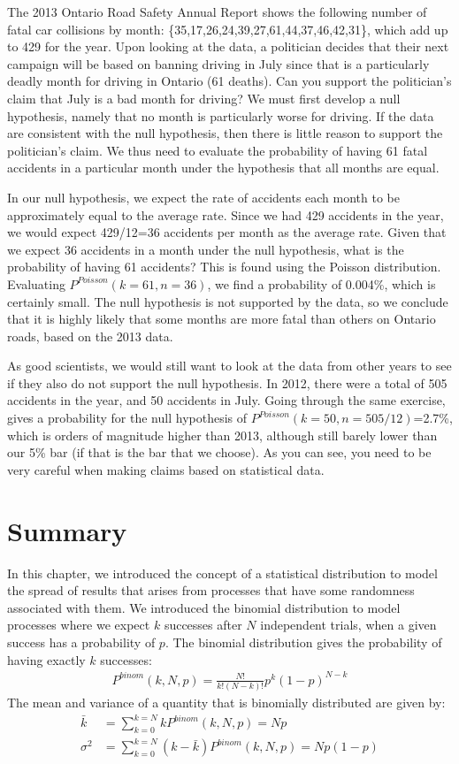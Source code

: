 \begin{example}{}{The 2013 Ontario Road Safety Annual Report shows the following number of fatal car collisions by month: \{35,17,26,24,39,27,61,44,37,46,42,31\}, which add up to 429 for the year. Upon looking at the data, a politician decides that their next campaign will be based on banning driving in July since that is a particularly deadly month for driving in Ontario (61 deaths). Can you support the politician's claim that July is a bad month for driving?}{}
We must first develop a null hypothesis, namely that no month is particularly worse for driving. If the data are consistent with the null hypothesis, then there is little reason to support the politician's claim. We thus need to evaluate the probability of having 61 fatal accidents in a particular month under the hypothesis that all months are equal. 

In our null hypothesis, we expect the rate of accidents each month to be approximately equal to the average rate. Since we had 429 accidents in the year, we would expect 429/12=36 accidents per month as the average rate. Given that we expect 36 accidents in a month under the null hypothesis, what is the probability of having 61 accidents? This is found using the Poisson distribution. Evaluating $P^{Poisson}(k=61,n=36)$, we find a probability of 0.004\%, which is certainly small. The null hypothesis is not supported by the data, so we conclude that it is highly likely that some months are more fatal than others on Ontario roads, based on the 2013 data.

As good scientists, we would still want to look at the data from other years to see if they also do not support the null hypothesis. In 2012, there were a total of 505 accidents in the year, and 50 accidents in July. Going through the same exercise, gives a probability for the null hypothesis of $P^{Poisson}(k=50,n=505/12)$=2.7\%, which is orders of magnitude higher than 2013, although still barely lower than our 5\% bar (if that is the bar that we choose). As you can see, you need to be very careful when making claims based on statistical data.
\end{example}


\section{Summary}
In this chapter, we introduced the concept of a statistical distribution to model the spread of results that arises from processes that have some randomness associated with them. We introduced the binomial distribution to model processes where we expect $k$ successes after $N$ independent trials, when a given success has a probability of $p$. The binomial distribution gives the probability of having exactly $k$ successes:
\begin{align}
P^{binom}(k,N,p)=\frac{N!}{k!(N-k)!}p^k(1-p)^{N-k}
\end{align}
The mean and variance of a quantity that is binomially distributed are given by:
\begin{align}
\bar k &= \sum_{k=0}^{k=N}kP^{binom}(k,N,p)=Np\\
\sigma^2 &= \sum_{k=0}^{k=N}(k-\bar k)P^{binom}(k,N,p)=Np(1-p)
\end{align}

